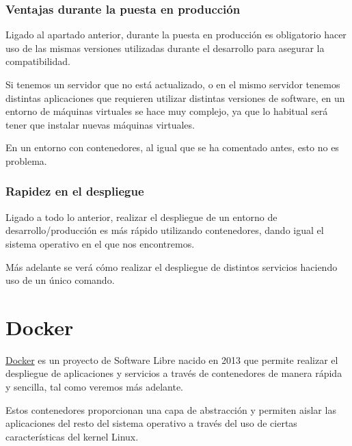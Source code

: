 \subsection{Ventajas durante la puesta en producción}
Ligado al apartado anterior, durante la puesta en producción es obligatorio hacer uso de las mismas versiones utilizadas durante el desarrollo para asegurar la compatibilidad.


Si tenemos un servidor que no está actualizado, o en el mismo servidor tenemos distintas aplicaciones que requieren utilizar distintas versiones de software, en un entorno de máquinas virtuales se hace muy complejo, ya que lo habitual será tener que instalar nuevas máquinas virtuales.


En un entorno con contenedores, al igual que se ha comentado antes, esto no es problema.

\subsection{Rapidez en el despliegue}

Ligado a todo lo anterior, realizar el despliegue de un entorno de desarrollo/producción es más rápido utilizando contenedores, dando igual el sistema operativo en el que nos encontremos.


Más adelante se verá cómo realizar el despliegue de distintos servicios haciendo uso de un único comando.


\chapter{Docker}

\href{https://www.docker.com/}{Docker} es un proyecto de Software Libre nacido en 2013 que permite realizar el despliegue de aplicaciones y servicios a través de contenedores de manera rápida y sencilla, tal como veremos más adelante.

Estos contenedores proporcionan una capa de abstracción y permiten aislar las aplicaciones del resto del sistema operativo a través del uso de ciertas características del kernel Linux.

